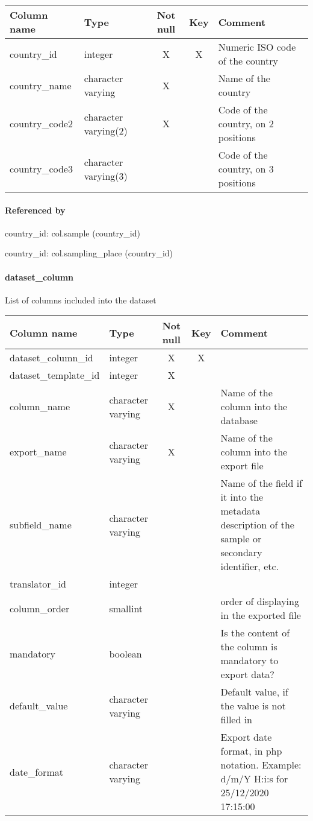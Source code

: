 \begin{tabular}{|l| p{2cm}|c|c| p{5cm}|}
\hline
Column name & Type & Not null & Key & Comment \\
\hline
country\_id & integer & X & X & Numeric ISO code of the country\\
country\_name & character varying & X &  & Name of the country\\
country\_code2 & character varying(2) & X &  & Code of the country, on 2 positions\\
country\_code3 & character varying(3) &  &  & Code of the country, on 3 positions\\
\hline
\end{tabular}
\paragraph{Referenced by}
country\_id: col.sample (country\_id)

country\_id: col.sampling\_place (country\_id)

\paragraph{dataset\_column}
List of columns included into the dataset

\begin{tabular}{|l| p{2cm}|c|c| p{5cm}|}
\hline
Column name & Type & Not null & Key & Comment \\
\hline
dataset\_column\_id & integer & X & X & \\
dataset\_template\_id & integer & X &  & \\
column\_name & character varying & X &  & Name of the column into the database\\
export\_name & character varying & X &  & Name of the column into the export file\\
subfield\_name & character varying &  &  & Name of the field if it into the metadata description of the sample or secondary identifier, etc.\\
translator\_id & integer &  &  & \\
column\_order & smallint &  &  & order of displaying in the exported file\\
mandatory & boolean &  &  & Is the content of the column is mandatory to export data?\\
default\_value & character varying &  &  & Default value, if the value is not filled in\\
date\_format & character varying &  &  & Export date format, in php notation. Example: d/m/Y H:i:s for 25/12/2020 17:15:00\\
\hline
\end{tabular}
